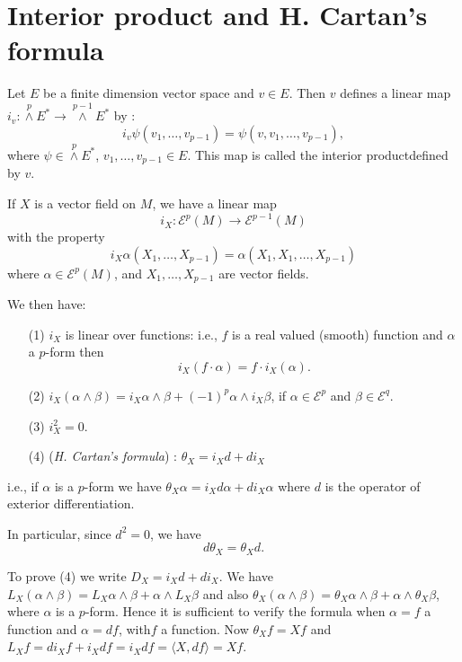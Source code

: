 \section*{Interior product and H. Cartan's formula}

Let $E$ be a finite dimension vector space and $v\in E$. Then $v$ defines a linear map $i_{v}:{\displaystyle{\mathop{\wedge}\limits^{p}}}E^{*}\to {\displaystyle{\mathop{\wedge}\limits^{p-1}}}E^{*}$ by :
$$
i_{v}\psi(v_{1},\ldots,v_{p-1})=\psi(v,v_{1},\ldots,v_{p-1}),
$$
where $\psi\in {\displaystyle{\mathop{\wedge}\limits^{p}}} E^{*}$, $v_{1},\ldots,v_{p-1}\in E$. This map is called the interior product\pageoriginale defined by $v$.

If $X$ is a vector field on $M$, we have a linear map
$$
i_{X}:\mathscr{E}^{p}(M)\to \mathscr{E}^{p-1}(M)
$$
with the property
$$
i_{X}\alpha(X_{1},\ldots,X_{p-1})=\alpha(X_{1},X_{1},\ldots,X_{p-1})
$$
where $\alpha\in \mathscr{E}^{p}(M)$, and $X_{1},\ldots,X_{p-1}$ are vector fields.

We then have:
\begin{itemize}
\item[(1)] $i_{X}$ is linear over functions: i.e., $f$ is a real valued (smooth) function and $\alpha$ a $p$-form then
$$
i_{X}(f\cdot \alpha)=f\cdot i_{X}(\alpha).
$$

\item[(2)] $i_{X}(\alpha\wedge\beta)=i_{X}\alpha\wedge \beta+(-1)^{p}\alpha\wedge i_{X}\beta$, if $\alpha\in \mathscr{E}^{p}$ and $\beta\in \mathscr{E}^{q}$.

\item[(3)] $i^{2}_{X}=0$.

\item[(4)] ({\em H. Cartan's formula}) : $\theta_{X}=i_{X}d+di_{X}$
\end{itemize}
i.e., if $\alpha$ is a $p$-form we have $\theta_{X}\alpha=i_{X}d\alpha+di_{X}\alpha$ where $d$ is the operator of exterior differentiation.

In particular, since $d^{2}=0$, we have
$$
d\theta_{X}=\theta_{X}d.
$$

To prove (4) we write $D_{X}=i_{X}d+di_{X}$. We have $L_{X}(\alpha \wedge \beta)=L_{X}\alpha\wedge \beta+\alpha\wedge L_{X}\beta$ and also $\theta_{X}(\alpha\wedge \beta)=\theta_{X}\alpha\wedge\beta+\alpha\wedge\theta_{X}\beta$, where $\alpha$ is a $p$-form. Hence it is sufficient to verify the formula when $\alpha=f$ a function and $\alpha=df$, with\pageoriginale $f$ a function. Now $\theta_{X}f=Xf$ and $L_{X}f=di_{X}f+i_{X}df=i_{X}df=\langle X,df\rangle=Xf$.

